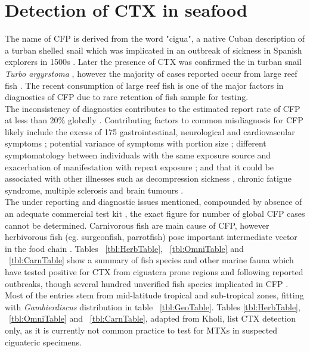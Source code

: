 \documentclass[12pt]{article}
\begin{document}
\section{Detection of CTX in seafood}
The name of CFP is derived from the word "cigua", a native Cuban description of a turban shelled snail which was implicated in an outbreak of sickness in Spanish explorers in 1500s \cite{gudger1930poisonous}. Later the presence of CTX was confirmed the in turban snail \emph{Turbo argyrstoma} \cite{yasumoto1976toxicity}, however the majority of cases reported occur from large reef fish \cite{hokama2001ciguatera,lewis2001changing,dechraoui2005use,laurent2005ciguatera}. The recent consumption of large reef fish is one of the major factors in diagnostics of CFP due to rare retention of fish sample for testing. \\
The inconsistency of diagnostics contributes to the estimated report rate of CFP at less than 20\% globally \cite{dickey2010ciguatera}. Contributing factors to common misdiagnosis for CFP likely include the excess of 175 gastrointestinal, neurological and cardiovascular symptoms \cite{sims1987theoretical}; potential variance of symptoms with portion size \cite{wong2008features,mak2013pacific}; different symptomatology between individuals with the same exposure source and exacerbation of manifestation with repeat exposure \cite{bagnis1979clinical,glaziou1993study}; and that it could be associated with other illnesses such as decompression sickness \cite{adams1993outbreak}, chronic fatigue syndrome, multiple sclerosis \cite{lindsay1997chronic,ting2001ciguatera} and brain tumours \cite{lindsay1997chronic}. \\
The under reporting and diagnostic issues mentioned, compounded by absence of an adequate commercial test kit \cite{wong2005study}, the exact figure for number of global CFP cases cannot be determined. Carnivorous fish are main cause of CFP, however herbivorous fish (eg. surgeonfish, parrotfish) pose important intermediate vector in the food chain \cite{cruz2006macroalgal,randall1958review,mak2013pacific}.%
Tables ~\ref{tbl:HerbTable}, ~\ref{tbl:OmniTable} and ~\ref{tbl:CarnTable} show a summary of fish species and other marine fauna which have tested positive for CTX from ciguatera prone regions and following reported outbreaks, though several hundred unverified fish species implicated in CFP \cite{}. %
Most of the entries stem from mid-latitude tropical and sub-tropical zones, fitting with \emph{Gambierdiscus} distribution in table ~\ref{tbl:GeoTable}. Tables \ref{tbl:HerbTable}, ~\ref{tbl:OmniTable} and ~\ref{tbl:CarnTable}, adapted from Kholi, \cite{kohli2013Gambierdiscus} list CTX detection only, as it is currently not common practice to test for MTXs in suspected ciguateric specimens. 
\end{document}
